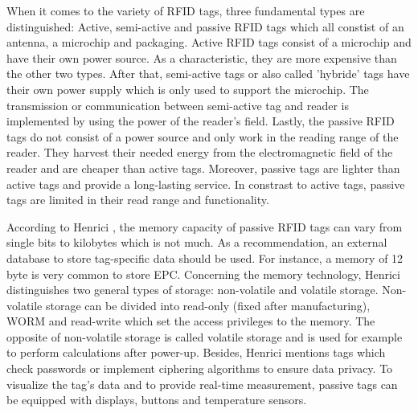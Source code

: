 When it comes to the variety of RFID tags, three fundamental types are distinguished: Active, semi-active and passive RFID tags \cite{henrici} which all constist of an antenna, a microchip and packaging. Active RFID tags consist of a microchip and have their own power source. As a characteristic, they are more expensive than the other two types. After that, semi-active tags or also called 'hybride' tags have their own power supply which is only used to support the microchip. The transmission or communication between semi-active tag and reader is implemented by using the power of the reader's field. Lastly, the passive RFID tags do not consist of a power source and only work in the reading range of the reader. They harvest their needed energy from the electromagnetic field of the reader and are cheaper than active tags. Moreover, passive tags are lighter than active tags and provide a long-lasting service. In constrast to active tags, passive tags are limited in their read range and functionality.

According to Henrici \cite{henrici}, the memory capacity of passive RFID tags can vary from single bits to kilobytes which is not much. As a recommendation, an external database to store tag-specific data should be used. For instance, a memory of 12 byte is very common to store \ac{EPC}. Concerning the memory technology, Henrici distinguishes two general types of storage: non-volatile and volatile storage. Non-volatile storage can be divided into read-only (fixed after manufacturing), \ac{WORM} and read-write which set the access privileges to the memory. The opposite of non-volatile storage is called volatile storage and is used for example to perform calculations after power-up. Besides, Henrici mentions tags which check passwords or implement ciphering algorithms to ensure data privacy. To visualize the tag's data and to provide real-time measurement, passive tags can be equipped with displays, buttons and temperature sensors. 


